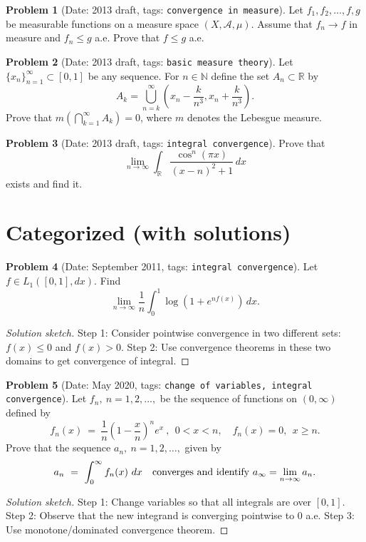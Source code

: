 \documentclass[11pt, notitlepage]{article}
\theoremstyle{definition}
\theoremstyle{definition}
\theoremstyle{definition}
\newtheorem{probstate}{Problem}
\theoremstyle{remark}
\newenvironment{problem}[2]{
    \begin{probstate}[Date: #1, tags: \texttt{#2}]
}
{
  \end{probstate}
}
\newenvironment{sketch}{
    \begin{proof}[Solution sketch]
}
{
    \end{proof}
}
\newcommand{\R}{\mathbb{R}}
\newcommand{\N}{\mathbb{N}}
\begin{document}
\begin{problem}{2013 draft}{convergence in measure}
Let $f_1, f_2, \ldots, f, g$ be measurable functions on a measure space  $(X, \mathcal{A},\mu)$. Assume that $f_n \to f$ in measure and $f_n \le g$ a.e. Prove that $f \le g$ a.e.
\end{problem}

\begin{problem}{2013 draft}{basic measure theory}
Let $\{x_n\}_{n=1}^{\infty} \subset [0,1]$ be any sequence. For $n \in \N$ define the set $A_n \subset \R$ by
  \[
   A_k=\bigcup_{n=k}^{\infty} \left(x_n-\frac{k}{n^3}, x_n+ \frac{k}{n^3} \right).
  \]
  Prove that $m(\bigcap_{k=1}^{\infty} A_k)=0$, where $m$ denotes the Lebesgue measure.
\end{problem}

\begin{problem}{2013 draft}{integral convergence}
Prove that
  \[
   \lim_{n \to \infty} \int_\R \frac{\cos^{n} (\pi  x)}{(x-n)^2+1} \, dx
  \]
  exists and find it.
\end{problem}

\section{Categorized (with solutions)}

\begin{problem}{September 2011}{integral convergence}
Let $f \in L_1([0,1], dx)$. Find
 \[
   \lim_{n \to \infty} \frac{1}{n}  \int_0^1 \log \left( 1+ e^{nf(x)} \right) \, dx.
 \]
\end{problem}
\begin{sketch}
Step 1: Consider pointwise convergence in two different sets: $f(x) \leq 0$ and $f(x) > 0$.
Step 2: Use convergence theorems in these two domains to get convergence of integral.
\end{sketch}

\begin{problem}{May 2020}{change of variables, integral convergence}
  Let $f_n, \ n=1,2,...,$ be the sequence of functions on $(0,\infty)$ defined by
$$
f_n(x) \ = \ \frac{1}{n}\left(1-\frac{x}{n}\right)^n e^{x} \ ,  \ \ 0<x<n, \quad f_n(x)=0, \ \ x\ge n.
$$
Prove that the sequence $a_n, \ n=1,2,\dots,$ given by
$$
a_n \ = \ \int_0^\infty f_n(x) \ dx \quad {\rm converges \ and \ identify \ } a_\infty=\lim_{n\to\infty} a_n.
$$
\end{problem}

\begin{sketch}
Step 1: Change variables so that all integrals are over $[0,1]$.
Step 2: Observe that the new integrand is converging pointwise to $0$ a.e.
Step 3: Use monotone/dominated convergence theorem.
\end{sketch}
\end{document}
